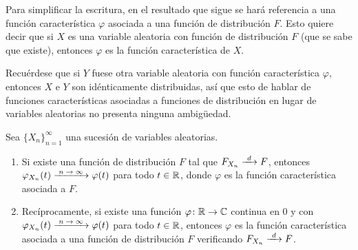 \documentclass[a4paper, 11pt, extrafontsizes]{memoir}
\begin{document}
Para simplificar la escritura, en el resultado que sigue se hará referencia a una función característica $\varphi$ asociada a una función de distribución $F$. Esto quiere decir que si $X$ es una variable aleatoria con función de distribución $F$ (que se sabe que existe), entonces $\varphi$ es la función característica de $X$. 

Recuérdese que si $Y$ fuese otra variable aleatoria con función característica $\varphi$, entonces $X$ e $Y$ son idénticamente distribuidas, así que esto de hablar de funciones características asociadas a funciones de distribución en lugar de variables aleatorias no presenta ninguna ambigüedad.

\begin{theorem}\label{teo:1.9.30}
    Sea $\{X_n\}_{n=1}^\infty$ una sucesión de variables aleatorias.
    \begin{enumerate}
        \item Si existe una función de distribución $F$ tal que $F_{X_n} \dconv F$, entonces $\varphi_{X_n}(t) \nconv \varphi(t)$ para todo $t \in \mathbb R$, donde $\varphi$ es la función característica asociada a $F$.
        \item Recíprocamente, si existe una función $\varphi \colon \mathbb R \to \mathbb C$ continua en $0$ y con $\varphi_{X_n}(t) \nconv \varphi(t)$ para todo $t \in \mathbb R$, entonces $\varphi$ es la función característica asociada a una función de distribución $F$ verificando $F_{X_n} \dconv F$.
    \end{enumerate}
    \end{theorem}
    
\end{document}
